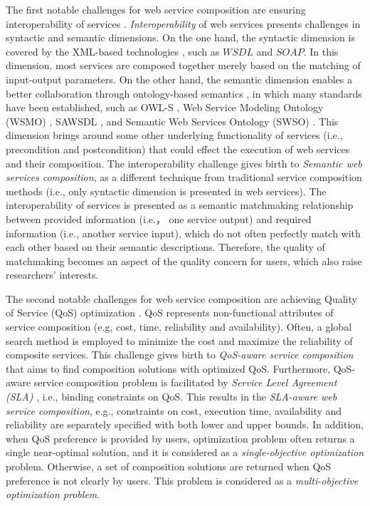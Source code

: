 The first notable challenges for web service composition are ensuring interoperability of services \cite{fensel2011semantic}. \emph{Interoperability} of web services presents challenges in syntactic and semantic dimensions. On the one hand, the syntactic dimension is covered by the XML-based technologies \cite{yu2008deploying}, such as $WSDL$ and $SOAP$. In this dimension, most services are composed together merely based on the matching of input-output parameters. On the other hand, the semantic dimension enables a better collaboration through ontology-based semantics \cite{o2005review}, in which many standards have been established, such as OWL-S \cite{martin2004owl}, Web Service Modeling Ontology (WSMO) \cite{lausen2005w3c}, SAWSDL \cite{kopecky2007sawsdl}, and Semantic Web Services Ontology (SWSO) \cite{petrie2016web}. This dimension brings around some other underlying functionality of services (i.e., precondition and postcondition) that could effect the execution of web services and their composition. The interoperability challenge gives birth to \emph{Semantic web services composition}, as a different technique from traditional service composition methods (i.e., only syntactic dimension is presented in web services). The interoperability of services is presented as a semantic matchmaking relationship between provided information (i.e.， one service output) and required information (i.e., another service input), which do not often perfectly match with each other based on their semantic descriptions. Therefore, the quality of matchmaking becomes an aspect of the quality concern for users, which also raise researchers' interests. 


The second notable challenges for web service composition are achieving Quality of Service (QoS) optimization \cite{fensel2011semantic}. QoS represents non-functional attributes of service composition (e.g, cost, time, reliability and availability). Often, a global search method is employed to minimize the cost and maximize the reliability of composite services. This challenge gives birth to \emph{QoS-aware service composition} that aims to find composition solutions with optimized QoS. Furthermore, QoS-aware service composition problem is facilitated by \emph{Service Level Agreement (SLA)} \cite{sahai2002automated}, i.e., binding constraints on QoS. This results in the \emph{SLA-aware web service composition}, e.g., constraints on cost, execution time, availability and reliability are separately specified with both lower and upper bounds. In addition, when QoS preference is provided by users, optimization problem often returns a single near-optimal solution, and it is considered as a \emph{single-objective optimization} problem. Otherwise, a set of composition solutions are returned when QoS preference is not clearly by users. This problem is considered as a \emph{multi-objective optimization problem}.  


